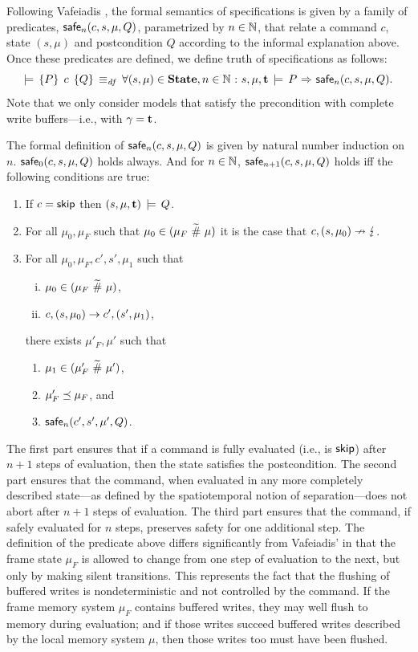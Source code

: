 \documentclass[11pt]{report}
\begin{document}
Following Vafeiadis \cite{V11}, the formal semantics of specifications is given by a family of predicates, $\mathsf{safe}_{n}(c,s,\mu,Q)$, parametrized by $n \in \mathbb{N}$, that relate a command $c$, state $(s,\mu)$ and postcondition $Q$ according to the informal explanation above. Once these predicates are defined, we define truth of specifications as follows: \[ \models\,\left\lbrace P \right\rbrace\;c\;\left\lbrace Q \right\rbrace \operatorname{\;\equiv_{\mathit{df}}\;} \forall (s,\mu) \in \mathbf{State}, n \in \mathbb{N} \operatorname{\,:\,} s,\mu,\mathbf{t} \,\models\, P \operatorname{\,\Rightarrow\,} \mathsf{safe}_{n}(c,s,\mu,Q).\]
Note that we only consider models that satisfy the precondition with complete write buffers---i.e., with $\gamma = \mathbf{t}$. 


The formal definition of $\mathsf{safe}_{n}(c,s,\mu,Q)$ is given by natural number induction on $n$. $\mathsf{safe}_{0}(c,s,\mu,Q)$ holds always. And for $n \in \mathbb{N}$, $\mathsf{safe}_{n+1}(c,s,\mu,Q)$ holds iff the following conditions are true: \begin{enumerate}
    \item If $c = \operatorname{\mathsf{skip}}$ then $(s,\mu,\mathbf{t}) \,\models\, Q$.

    \item For all $\mu_0,\mu_F$ such that $\mu_0 \in (\mu_F \operatorname{\,\widetilde{\#}\,} \mu)$ it is the case that $c,(s,\mu_0) \nrightarrow \lightning$.

    \item For all $\mu_0,\mu_F,c',s',\mu_1$ such that \begin{enumerate}[(i)]
        \item $\mu_0 \in (\mu_F \operatorname{\,\widetilde{\#}\,} \mu)$,
        \item $c,(s,\mu_0) \rightarrow c',(s',\mu_1)$,
    \end{enumerate} there exists $\mu'_F,\mu'$ such that \begin{enumerate}
        \item $\mu_1 \in (\mu'_F \operatorname{\,\widetilde{\#}\,} \mu')$,
        \item $\mu'_F \preceq \mu_F$, and
        \item $\mathsf{safe}_{n}(c',s',\mu',Q)$.
    \end{enumerate}

\end{enumerate}

The first part ensures that if a command is fully evaluated (i.e., is $\operatorname{\mathsf{skip}}$) after $n+1$ steps of evaluation, then the state satisfies the postcondition. The second part ensures that the command, when evaluated in any more completely described state---as defined by the spatiotemporal notion of separation---does not abort after $n+1$ steps of evaluation. The third part ensures that the command, if safely evaluated for $n$ steps, preserves safety for one additional step. The definition of the predicate above differs significantly from Vafeiadis' in that the frame state $\mu_F$ is allowed to change from one step of evaluation to the next, but only by making silent transitions. This represents the fact that the flushing of buffered writes is nondeterministic and not controlled by the command. If the frame memory system $\mu_F$ contains buffered writes, they may well flush to memory during evaluation; and if those writes succeed buffered writes described by the local memory system $\mu$, then those writes too must have been flushed. 
\end{document}
